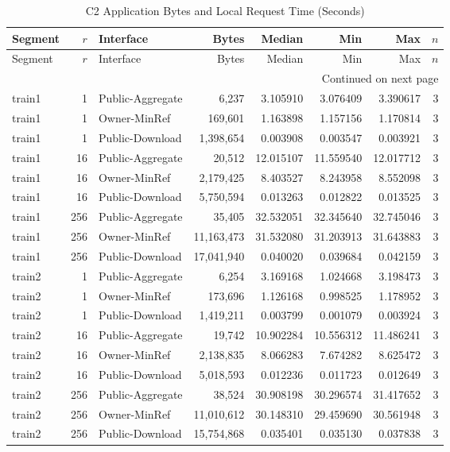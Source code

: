 \begingroup\small\setlength{\tabcolsep}{5pt}
\begin{longtable}{@{}lrlrrrrr@{}}
\caption{C2 Application Bytes and Local Request Time (Seconds)}\label{tab:key-c2-statistics}\\
\toprule Segment & $r$ & Interface & Bytes & Median & Min & Max & $n$\\\midrule\endfirsthead
\toprule Segment & $r$ & Interface & Bytes & Median & Min & Max & $n$\\\midrule\endhead
\midrule\multicolumn{8}{r}{Continued on next page}\\\endfoot
\bottomrule\endlastfoot
train1 & 1 & Public-Aggregate & 6,237 & 3.105910 & 3.076409 & 3.390617 & 3\\
train1 & 1 & Owner-MinRef & 169,601 & 1.163898 & 1.157156 & 1.170814 & 3\\
train1 & 1 & Public-Download & 1,398,654 & 0.003908 & 0.003547 & 0.003921 & 3\\
train1 & 16 & Public-Aggregate & 20,512 & 12.015107 & 11.559540 & 12.017712 & 3\\
train1 & 16 & Owner-MinRef & 2,179,425 & 8.403527 & 8.243958 & 8.552098 & 3\\
train1 & 16 & Public-Download & 5,750,594 & 0.013263 & 0.012822 & 0.013525 & 3\\
train1 & 256 & Public-Aggregate & 35,405 & 32.532051 & 32.345640 & 32.745046 & 3\\
train1 & 256 & Owner-MinRef & 11,163,473 & 31.532080 & 31.203913 & 31.643883 & 3\\
train1 & 256 & Public-Download & 17,041,940 & 0.040020 & 0.039684 & 0.042159 & 3\\
train2 & 1 & Public-Aggregate & 6,254 & 3.169168 & 1.024668 & 3.198473 & 3\\
train2 & 1 & Owner-MinRef & 173,696 & 1.126168 & 0.998525 & 1.178952 & 3\\
train2 & 1 & Public-Download & 1,419,211 & 0.003799 & 0.001079 & 0.003924 & 3\\
train2 & 16 & Public-Aggregate & 19,742 & 10.902284 & 10.556312 & 11.486241 & 3\\
train2 & 16 & Owner-MinRef & 2,138,835 & 8.066283 & 7.674282 & 8.625472 & 3\\
train2 & 16 & Public-Download & 5,018,593 & 0.012236 & 0.011723 & 0.012649 & 3\\
train2 & 256 & Public-Aggregate & 38,524 & 30.908198 & 30.296574 & 31.417652 & 3\\
train2 & 256 & Owner-MinRef & 11,010,612 & 30.148310 & 29.459690 & 30.561948 & 3\\
train2 & 256 & Public-Download & 15,754,868 & 0.035401 & 0.035130 & 0.037838 & 3\\
\end{longtable}
\endgroup
